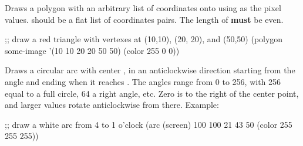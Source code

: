 Draws a polygon with an arbitrary list of coordinates onto  using  as the pixel values.\newline
{} should be a flat list of coordinates pairs. The length of  {\bf must} be even.
\begin{schemedisplay}
;; draw a red triangle with vertexes at (10,10), (20, 20), and (50,50)
(polygon some-image '(10 10 20 20 50 50) (color 255 0 0))
\end{schemedisplay}








Draws a circular arc with center ,  in an anticlockwise direction starting from the angle  and ending when it reaches . The angles range from 0 to 256, with 256 equal to a full circle, 64 a right angle, etc. Zero is to the right of the center point, and larger values rotate anticlockwise from there. Example: 

\begin{schemedisplay}
;; draw a white arc from 4 to 1 o'clock
(arc (screen) 100 100 21 43 50 (color 255 255 255))
\end{schemedisplay}








